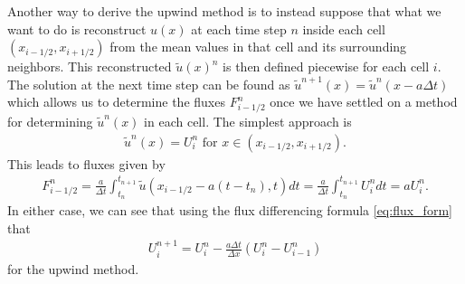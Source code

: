 Another way to derive the upwind method is to instead suppose that what we want to do is reconstruct $u(x)$ at each time step $n$ inside each cell $(x_{i-1/2},x_{i+1/2})$ from the mean values in that cell and its surrounding neighbors.  This reconstructed $\tilde{u}(x)^n$ is then defined piecewise for each cell $i$.  The solution at the next time step can be found as $\tilde{u}^{n+1}(x) = \tilde{u}^n(x-a\Delta t)$ which allows us to determine the fluxes $F_{i-1/2}^n$ once we have settled on a method for determining $\tilde{u}^n(x)$ in each cell.  The simplest approach is
\begin{gather}
\tilde{u}^n(x) = U^n_i \mbox{ for } x \in (x_{i-1/2},x_{i+1/2}).
\end{gather}
This leads to fluxes given by
\begin{gather}
F_{i-1/2}^n = \frac{a}{\Delta t} \int_{t_n}^{t_{n+1}}\tilde{u}(x_{i-1/2}-a(t-t_n),t)dt = \frac{a}{\Delta t} \int_{t_n}^{t_{n+1}}U_i^n dt = aU_i^n.
\end{gather}
In either case, we can see that using the flux differencing formula \eqref{eq:flux_form} that
\begin{gather}
U_i^{n+1} = U_i^n - \frac{a\Delta t}{\Delta x}\left(U_i^n-U_{i-1}^n\right)
\end{gather}
for the upwind method.

